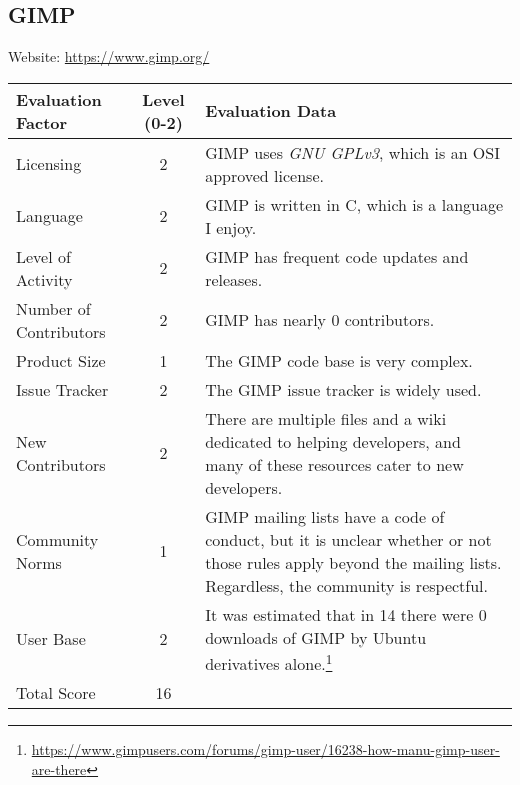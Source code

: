 \documentclass[11pt]{article}
\begin{document}
\subsection{GIMP}
\nopagebreak
Website: \url{https://www.gimp.org/}
\nopagebreak
\begin{center}
\begin{tabularx}{\textwidth}{|l|c|X|}
	\hline
	\textbf{Evaluation Factor} & \textbf{Level (0-2)} & \textbf{Evaluation Data} \\\hline
	Licensing & 2 & GIMP uses \textit{GNU GPLv3}, which is an OSI approved license.\\\hline
	Language & 2 & GIMP is written in C, which is a language I enjoy.\\\hline
	Level of Activity & 2 & GIMP has frequent code updates and releases.\\\hline
	Number of Contributors & 2 & GIMP has nearly 0 contributors.\\\hline
	Product Size & 1 & The GIMP code base is very complex.\\\hline
	Issue Tracker & 2 & The GIMP issue tracker is widely used.\\\hline
	New Contributors & 2 & There are multiple files and a wiki dedicated to helping developers, and many of these resources cater to new developers.\\\hline
	Community Norms & 1 & GIMP mailing lists have a code of conduct, but it is unclear whether or not those rules apply beyond the mailing lists.  Regardless, the community is respectful.\\\hline
	User Base & 2 & It was estimated that in 14 there were 0 downloads of GIMP by Ubuntu derivatives alone.\footnote{\url{https://www.gimpusers.com/forums/gimp-user/16238-how-manu-gimp-user-are-there}}\\\hline
	Total Score & 16 & \\\hline
\end{tabularx}
\end{center}
\end{document}
